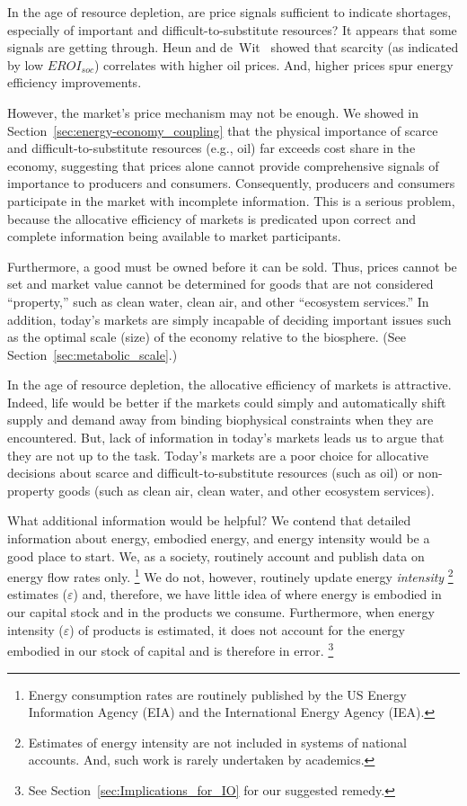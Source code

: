 In the age of resource depletion, 
are price signals sufficient to indicate shortages, 
especially of important and difficult-to-substitute resources?
It appears that some signals are getting through.
Heun and de~Wit~\cite{Heun:2012ek}
showed that scarcity (as indicated by low $EROI_{soc}$)
correlates with higher oil prices.
And, higher prices spur energy efficiency improvements.\cite{Vlasic:2013aa}

However, the market's price mechanism may not be enough.
We showed in Section~\ref{sec:energy-economy_coupling}
that the physical importance 
of scarce and difficult-to-substitute resources (e.g., oil) 
far exceeds cost share in the economy,
suggesting that prices alone cannot provide comprehensive
signals of importance to producers and consumers.
Consequently, producers and consumers participate 
in the market with incomplete information.
This is a serious problem, 
because the allocative efficiency of markets 
is predicated upon
correct and complete information being available to market participants.

Furthermore, a good must be owned before 
it can be sold.
Thus, prices cannot be set and market value cannot be determined
for goods that are not considered ``property,'' 
such as clean water, clean air, and other ``ecosystem services.''
In addition, today's markets are simply incapable of deciding
important issues such as the optimal scale (size) of the economy
relative to the biosphere. (See Section~\ref{sec:metabolic_scale}.)

In the age of resource depletion, the allocative efficiency of markets is attractive.
Indeed, life would be better if the markets could simply 
and automatically shift supply and demand away from
binding biophysical constraints when they are encountered. 
But, lack of information
in today's markets leads us to argue that they are not up to the task. 
Today's markets are a poor choice for allocative decisions 
about scarce and difficult-to-substitute resources (such as oil)
or non-property goods (such as clean air, clean water, and other ecosystem services).

What additional information would be helpful?
We contend that detailed information about energy, embodied energy, and energy intensity
would be a good place to start.
We, as a society, routinely account and publish 
data on energy flow rates only.%
	 \footnote{
	 Energy consumption rates are routinely published by the 
	 US Energy Information Agency (EIA) and the 
	 International Energy Agency (IEA).
	 }
We do not, however, routinely update energy \emph{intensity}%
	\footnote{
	Estimates of energy intensity are not included in systems of national accounts.
	And, such work is rarely undertaken by academics.\citep{Bullard1975, EIOLCA2014} 
	}
estimates ($\varepsilon$)
and, therefore, 
we have little idea of where energy is embodied 
in our capital stock and 
in the products we consume.
Furthermore, when energy intensity ($\varepsilon$) of products is estimated, 
it does not account for the energy embodied in our stock of capital
and is therefore in error.%
	\footnote{
	See Section~\ref{sec:Implications_for_IO} for our suggested remedy.
	}
	
